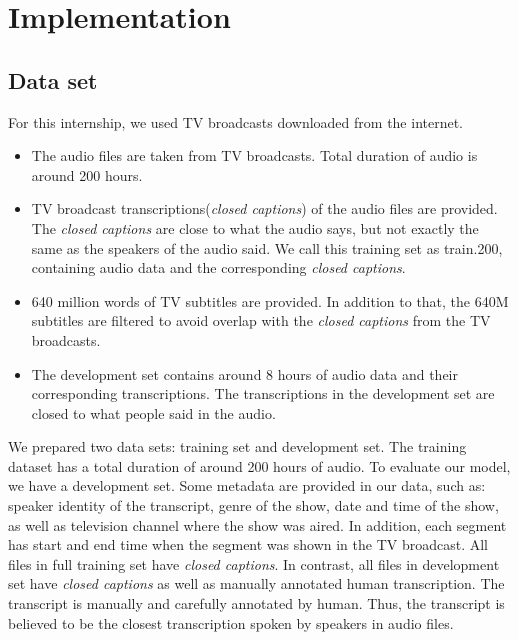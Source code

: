 \chapter{Implementation}

\section{Data set}
For this internship, we used TV broadcasts downloaded from the internet. 
\begin{itemize}
\item The audio files are taken from TV broadcasts. Total duration of audio is around 200 hours.  
\item TV broadcast transcriptions(\textit{closed captions}) of the audio files are provided. The \textit{closed captions} are close to what the audio says, but not exactly the same as the speakers of the audio said.  We call this training set as train.200, containing audio data and the corresponding \textit{closed captions}.
\item 640 million words of TV subtitles are provided. In addition to that, the 640M subtitles are filtered to avoid overlap with the \textit{closed captions} from the TV broadcasts.
\item The development set contains around 8 hours of audio data and their corresponding transcriptions. The transcriptions in the development set are closed to what people said in the audio. 
\end{itemize} 

We prepared two data sets: training set and development set. The training dataset has a total duration of around 200 hours of audio. To evaluate our model, we have a development set. Some metadata are provided in our data, such as: speaker identity of the transcript, genre of the show, date and time of the show, as well as television channel where the show was aired. In addition, each segment has start and end time when the segment was shown in the TV broadcast. All files in full training set have \textit{closed captions}. In contrast, all files in development set have \textit{closed captions} as well as manually annotated human transcription. The transcript is manually and carefully annotated by human. Thus, the transcript is believed to be the closest transcription spoken by speakers in audio files. 

